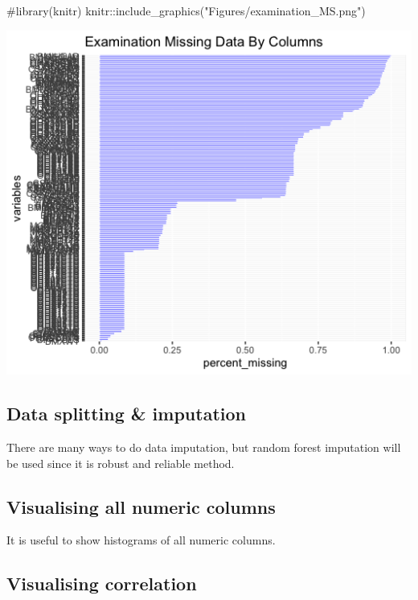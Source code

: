 \begin{Schunk}
\begin{Sinput}
#library(knitr)
knitr::include_graphics("Figures/examination_MS.png")
\end{Sinput}


\begin{center}\includegraphics[width=7.15in]{Figures/examination_MS} \end{center}

\end{Schunk}

\hypertarget{data-splitting-imputation}{%
\subsection{Data splitting \&
imputation}\label{data-splitting-imputation}}

There are many ways to do data imputation, but random forest imputation
will be used since it is robust and reliable method.

\hypertarget{visualising-all-numeric-columns}{%
\subsection{Visualising all numeric
columns}\label{visualising-all-numeric-columns}}

It is useful to show histograms of all numeric columns.

\hypertarget{visualising-correlation}{%
\subsection{Visualising correlation}\label{visualising-correlation}}

